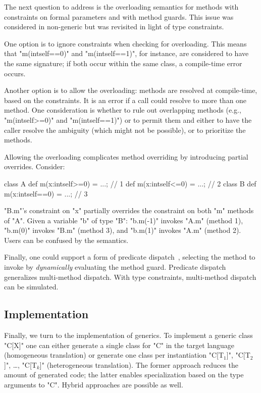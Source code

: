The next question to address is the overloading semantics for
methods with constraints on formal parameters and with method
guards.  This issue was considered in non-generic \Xten but was
revisited in light of type constraints.

One option is to ignore constraints when checking for
overloading.  This means that \xcd"m(int{self==0})" and
\xcd"m(int{self==1})", for instance, are considered to have the
same signature; if both occur within the same class, a
compile-time error occurs.

Another option is to allow the
overloading: methods are resolved at compile-time, based on the
constraints.  It is an error if a call could resolve to more
than one method.  One consideration is whether to rule out overlapping
methods (e.g., \xcd"m(int{self>=0})" and \xcd"m(int{self==1})")
or to permit them and either to have the caller resolve the
ambiguity (which might not be possible), or to prioritize the
methods.


Allowing the overloading complicates method overriding by
introducing partial overrides.
Consider:
\begin{xtennoindent}
class A {
  def m(x:int{self>=0}) = ...; // 1
  def m(x:int{self<=0}) = ...; // 2
}
class B {
  def m(x:int{self==0}) = ...; // 3
}
\end{xtennoindent}
\noindent
\xcd"B.m"'s constraint on \xcd"x" partially overrides the
constraint on both \xcd"m" methods of \xcd"A".  Given a variable
\xcd"b" of type \xcd"B": \xcd"b.m(-1)" invokes \xcd"A.m" (method 1),
\xcd"b.m(0)" invokes \xcd"B.m" (method 3), and \xcd"b.m(1)"
invokes \xcd"A.m" (method 2).  Users can be confused by the
semantics.

Finally, one could support a form of predicate
dispatch~\cite{jpred}, selecting the method to invoke by
\emph{dynamically} evaluating the method guard.  Predicate
dispatch generalizes multi-method dispatch.  With type
constraints, multi-method dispatch can be simulated.

\subsection{Implementation}

Finally, we turn to the implementation of generics.
To implement a generic class \xcd"C[X]" one can either generate a single 
class for \xcd"C" in the target language (homogeneous translation)
or generate one class per instantiation
\xcdmath"C[T$_1$]",
\xcdmath"C[T$_2$]", \dots,
\xcdmath"C[T$_k$]" (heterogeneous translation).
The former approach reduces the amount of generated code; the
latter enables specialization based on the type arguments to
\xcd"C".  Hybrid approaches are possible as well.

